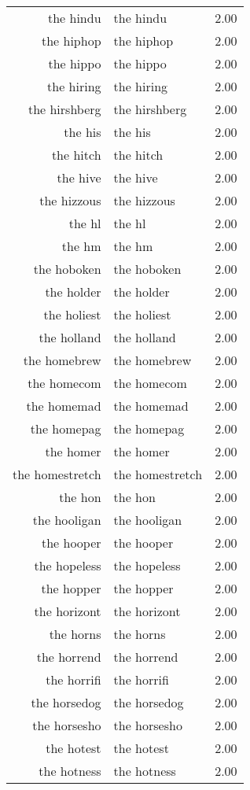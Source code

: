 \begin{table}[ht]
\begin{tabular}{rlr}
  the hindu & the hindu & 2.00 \\ 
  the hiphop & the hiphop & 2.00 \\ 
  the hippo & the hippo & 2.00 \\ 
  the hiring & the hiring & 2.00 \\ 
  the hirshberg & the hirshberg & 2.00 \\ 
  the his & the his & 2.00 \\ 
  the hitch & the hitch & 2.00 \\ 
  the hive & the hive & 2.00 \\ 
  the hizzous & the hizzous & 2.00 \\ 
  the hl & the hl & 2.00 \\ 
  the hm & the hm & 2.00 \\ 
  the hoboken & the hoboken & 2.00 \\ 
  the holder & the holder & 2.00 \\ 
  the holiest & the holiest & 2.00 \\ 
  the holland & the holland & 2.00 \\ 
  the homebrew & the homebrew & 2.00 \\ 
  the homecom & the homecom & 2.00 \\ 
  the homemad & the homemad & 2.00 \\ 
  the homepag & the homepag & 2.00 \\ 
  the homer & the homer & 2.00 \\ 
  the homestretch & the homestretch & 2.00 \\ 
  the hon & the hon & 2.00 \\ 
  the hooligan & the hooligan & 2.00 \\ 
  the hooper & the hooper & 2.00 \\ 
  the hopeless & the hopeless & 2.00 \\ 
  the hopper & the hopper & 2.00 \\ 
  the horizont & the horizont & 2.00 \\ 
  the horns & the horns & 2.00 \\ 
  the horrend & the horrend & 2.00 \\ 
  the horrifi & the horrifi & 2.00 \\ 
  the horsedog & the horsedog & 2.00 \\ 
  the horsesho & the horsesho & 2.00 \\ 
  the hotest & the hotest & 2.00 \\ 
  the hotness & the hotness & 2.00 \\ 

\end{tabular}
\end{table}
